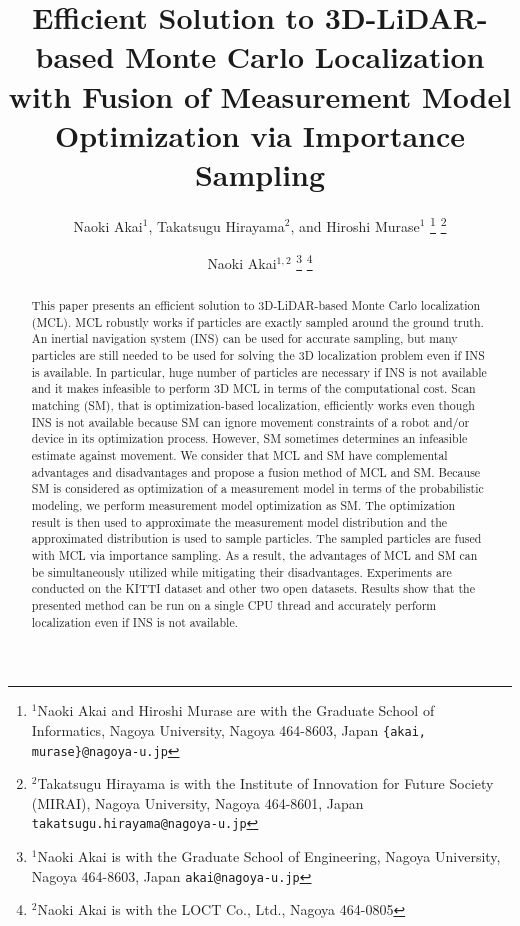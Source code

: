 \documentclass[letterpaper, 10 pt, conference]{ieeeconf}  %
\title{\LARGE \bf
Efficient Solution to 3D-LiDAR-based Monte Carlo Localization with Fusion of Measurement Model Optimization via Importance Sampling
}
\author{Naoki Akai$^{1}$, Takatsugu Hirayama$^{2}$, and Hiroshi Murase$^{1}$%
\thanks{$^{1}$Naoki Akai and Hiroshi Murase are with the Graduate School of Informatics, Nagoya University, Nagoya 464-8603, Japan {\tt\small \{akai, murase\}@nagoya-u.jp}}%
\thanks{$^{2}$Takatsugu Hirayama is with the Institute of Innovation for Future Society (MIRAI), Nagoya University, Nagoya 464-8601, Japan {\tt\small takatsugu.hirayama@nagoya-u.jp}}%
}
\author{Naoki Akai$^{1,2}$%
\thanks{$^{1}$Naoki Akai is with the Graduate School of Engineering, Nagoya University, Nagoya 464-8603, Japan {\tt\small akai@nagoya-u.jp}}%
\thanks{$^{2}$Naoki Akai is with the LOCT Co., Ltd., Nagoya 464-0805}%
}
\begin{document}
\newcommand{\1}{\mbox{1}\hspace{-0.25em}\mbox{l}}
\renewcommand{\baselinestretch}{1.0}


\maketitle
\thispagestyle{empty}
\pagestyle{empty}


\begin{abstract}

This paper presents an efficient solution to 3D-LiDAR-based Monte Carlo localization (MCL). MCL robustly works if particles are exactly sampled around the ground truth. An inertial navigation system (INS) can be used for accurate sampling, but many particles are still needed to be used for solving the 3D localization problem even if INS is available. In particular, huge number of particles are necessary if INS is not available and it makes infeasible to perform 3D MCL in terms of the computational cost. Scan matching (SM), that is optimization-based localization, efficiently works even though INS is not available because SM can ignore movement constraints of a robot and/or device in its optimization process. However, SM sometimes determines an infeasible estimate against movement. We consider that MCL and SM have complemental advantages and disadvantages and propose a fusion method of MCL and SM. Because SM is considered as optimization of a measurement model in terms of the probabilistic modeling, we perform measurement model optimization as SM. The optimization result is then used to approximate the measurement model distribution and the approximated distribution is used to sample particles. The sampled particles are fused with MCL via importance sampling. As a result, the advantages of MCL and SM can be simultaneously utilized while mitigating their disadvantages. Experiments are conducted on the KITTI dataset and other two open datasets. Results show that the presented method can be run on a single CPU thread and accurately perform localization even if INS is not available.

\end{abstract}

\end{document}
